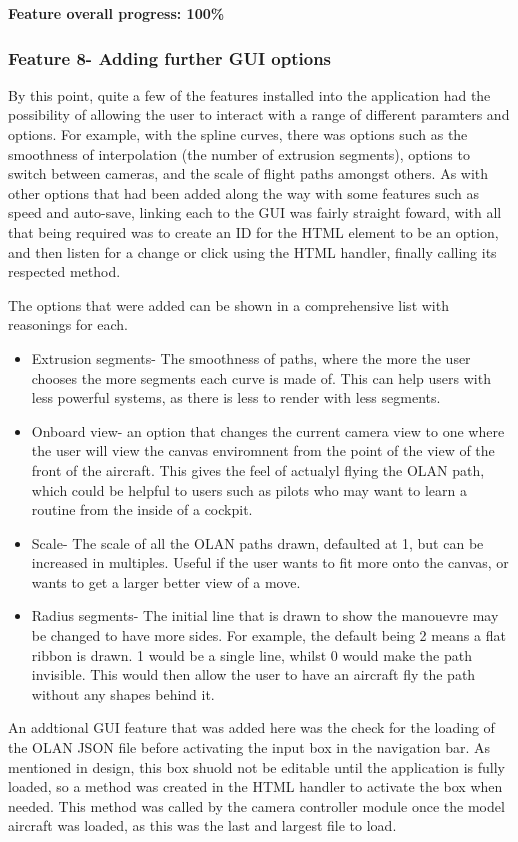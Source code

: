 \textbf{Feature overall progress: 100\%}

\subsubsection{Feature 8- Adding further GUI options}
By this point, quite a few of the features installed into the application had the possibility of allowing the user to interact with a range of different paramters and options. For example, with the spline curves, there was options such as the smoothness of interpolation (the number of extrusion segments), options to switch between cameras, and the scale of flight paths amongst others. As with other options that had been added along the way with some features such as speed and auto-save, linking each to the GUI was fairly straight foward, with all that being required was to create an ID for the HTML element to be an option, and then listen for a change or click using the HTML handler, finally calling its respected method.  

The options that were added can be shown in a comprehensive list with reasonings for each.
\begin{itemize}
	\item Extrusion segments- The smoothness of paths, where the more the user chooses the more segments each curve is made of. This can help users with less powerful systems, as there is less to render with less segments.
	\item Onboard view- an option that changes the current camera view to one where the user will view the canvas enviromnent from the point of the view of the front of the aircraft. This gives the feel of actualyl flying the OLAN path, which could be helpful to users such as pilots who may want to learn a routine from the inside of a cockpit.
	\item Scale- The scale of all the OLAN paths drawn, defaulted at 1, but can be increased in multiples. Useful if the user wants to fit more onto the canvas, or wants to get a larger better view of a move.
	\item Radius segments- The initial line that is drawn to show the manouevre may be changed to have more sides. For example, the default being 2 means a flat ribbon is drawn. 1 would be a single line, whilst 0 would make the path invisible. This would then allow the user to have an aircraft fly the path without any shapes behind it.
\end{itemize}

An addtional GUI feature that was added here was the check for the loading of the OLAN JSON file before activating the input box in the navigation bar. As mentioned in design, this box shuold not be editable until the application is fully loaded, so a method was created in the HTML handler to activate the box when needed. This method was called by the camera controller module once the model aircraft was loaded, as this was the last and largest file to load.

